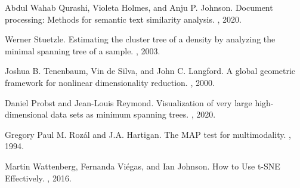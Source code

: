 \documentclass{article}
\begin{document}
\begin{thebibliography}{10}
Abdul Wahab Qurashi, Violeta Holmes, and Anju P. Johnson.
\newblock Document processing: Methods for semantic text similarity analysis.
, 2020.

Werner Stuetzle.
\newblock Estimating the cluster tree of a density by analyzing the minimal spanning tree of a sample.
, 2003.

Joshua B. Tenenbaum, Vin de Silva, and John C. Langford.
\newblock A global geometric framework for nonlinear dimensionality reduction.
, 2000.

Daniel Probst and Jean-Louis Reymond.
\newblock Visualization of very large high-dimensional data sets as minimum spanning trees.
, 2020.

Gregory Paul M. Roz\'al and J.A. Hartigan.
\newblock The MAP test for multimodality.
, 1994.

Martin Wattenberg, Fernanda Vi\'egas, and Ian Johnson.
\newblock How to Use t-SNE Effectively.
, 2016.

\end{thebibliography}
\end{document}
